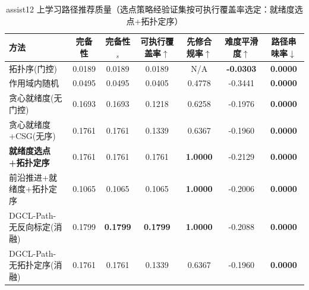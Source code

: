 \begin{table}[htbp]
\centering
\caption{assist12 上学习路径推荐质量（选点策略经验证集按可执行覆盖率选定：就绪度选点+拓扑定序）}
\label{tab:path_assist12}
\begin{tabular}{lcccccc}
\toprule
方法 & 完备性 & 完备性$_s$ & 可执行覆盖率$\uparrow$ & 先修合规率$\uparrow$ & 难度平滑度$\uparrow$ & 路径串味率$\downarrow$ \\
\midrule
拓扑序(门控) & 0.0189 & 0.0189 & 0.0189 & N/A & \textbf{-0.0303} & \textbf{0.0000} \\
作用域内随机 & 0.0495 & 0.0495 & 0.0405 & 0.4778 & -0.3441 & \textbf{0.0000} \\
贪心就绪度(无门控) & 0.1693 & 0.1693 & 0.1218 & 0.6258 & -0.1976 & \textbf{0.0000} \\
贪心就绪度+CSG(无序) & 0.1761 & 0.1761 & 0.1339 & 0.6367 & -0.1960 & \textbf{0.0000} \\
\textbf{就绪度选点+拓扑定序} & 0.1761 & 0.1761 & 0.1761 & \textbf{1.0000} & -0.2129 & \textbf{0.0000} \\
前沿推进+就绪度+拓扑定序 & 0.1065 & 0.1065 & 0.1065 & \textbf{1.0000} & -0.2006 & \textbf{0.0000} \\
DGCL-Path-无反向标定(消融) & 0.1799 & \textbf{0.1799} & \textbf{0.1799} & \textbf{1.0000} & -0.2088 & \textbf{0.0000} \\
DGCL-Path-无拓扑定序(消融) & 0.1761 & 0.1761 & 0.1339 & 0.6367 & -0.1960 & \textbf{0.0000} \\
\bottomrule
\end{tabular}
\end{table}
